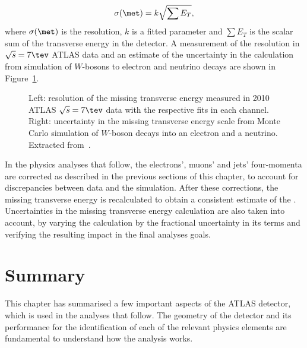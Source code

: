 \begin{equation}
\displaystyle
\sigma(\met) = k \sqrt{\sum E_T},
\label{eq:met_sigma}
\end{equation}
where $\sigma(\met)$ is the \met resolution, $k$ is a fitted parameter and $\sum E_T$ is the scalar sum of the transverse energy in the detector.
A measurement of the \met resolution in $\sqrt{s} = 7\tev$ ATLAS data and an estimate of the uncertainty in the \met calculation from simulation of $W$-bosons to electron
and neutrino decays are shown in Figure~\ref{fig:met}.

\begin{figure}
\centering
{}
\caption{Left: resolution of the missing transverse energy measured in 2010 ATLAS $\sqrt{s} = 7\tev$ data with the respective fits in each channel. Right: uncertainty in the missing transverse energy scale from Monte Carlo simulation of $W$-boson decays into an electron and a neutrino. Extracted from~\cite{atlas7met}.}
\label{fig:met}
\end{figure}

In the physics analyses that follow, the electrons', muons' and jets' four-momenta are corrected as described in the previous sections of this chapter, to account for
discrepancies between data and the simulation. After these corrections, the missing transverse energy is recalculated to obtain a consistent estimate of the \met.
Uncertainties in the missing transverse energy calculation are also taken into account, by varying the \met calculation by the fractional uncertainty in
its terms and verifying the resulting impact in the final analyses goals.

\section{Summary}

This chapter has summarised a few important aspects of the ATLAS detector, which is used in the analyses that follow. The geometry of the detector and its performance for the
identification of each of the relevant physics elements are fundamental to understand how the analysis works.
